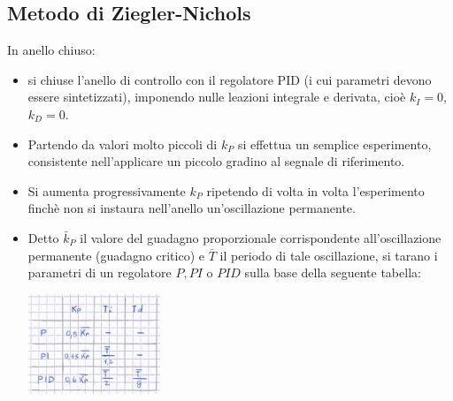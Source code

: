 \begin{landscape}
\begin{multicols*}{2}
    \subsection{Metodo di Ziegler-Nichols}
    In anello chiuso:
    \begin{itemize}
        \item si chiuse l'anello di controllo con il regolatore PID (i cui parametri devono essere sintetizzati), imponendo nulle leazioni integrale e derivata, cioè $k_I = 0$, $k_D = 0$.
        \item Partendo da valori molto piccoli di $k_P$ si effettua un semplice esperimento, consistente nell'applicare un piccolo gradino al segnale di riferimento.
        \item Si aumenta progressivamente $k_P$ ripetendo di volta in volta l'esperimento finchè non si instaura nell'anello un'oscillazione permanente.
        \item Detto $\bar{k}_P$ il valore del guadagno proporzionale corrispondente all'oscillazione permanente (guadagno critico) e $\bar{T}$ il periodo di tale oscillazione, si tarano i parametri di un regolatore $P, PI$ o $PID$ sulla base della seguente tabella:
        \begin{center}
            \includegraphics[height=3cm]{../formulario/img7.JPG}
        \end{center}
    \end{itemize}

\end{multicols*}
\end{landscape}
